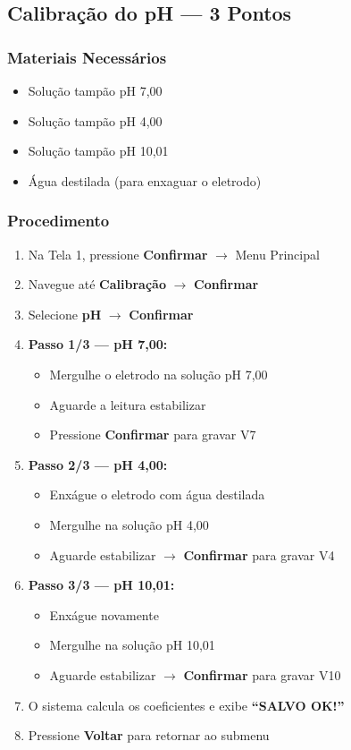 \documentclass[12pt,a4paper]{article}
\begin{document}
\subsection{Calibração do pH --- 3 Pontos}

\subsubsection{Materiais Necessários}
\begin{itemize}[nosep]
  \item Solução tampão pH 7,00
  \item Solução tampão pH 4,00
  \item Solução tampão pH 10,01
  \item Água destilada (para enxaguar o eletrodo)
\end{itemize}

\subsubsection{Procedimento}

\begin{enumerate}[nosep]
  \item Na Tela 1, pressione \textbf{Confirmar} $\rightarrow$ Menu Principal
  \item Navegue até \textbf{Calibração} $\rightarrow$ \textbf{Confirmar}
  \item Selecione \textbf{pH} $\rightarrow$ \textbf{Confirmar}
  \item \textbf{Passo 1/3 --- pH 7,00:}
  \begin{itemize}[nosep]
    \item Mergulhe o eletrodo na solução pH 7,00
    \item Aguarde a leitura estabilizar
    \item Pressione \textbf{Confirmar} para gravar V7
  \end{itemize}
  \item \textbf{Passo 2/3 --- pH 4,00:}
  \begin{itemize}[nosep]
    \item Enxágue o eletrodo com água destilada
    \item Mergulhe na solução pH 4,00
    \item Aguarde estabilizar $\rightarrow$ \textbf{Confirmar} para gravar V4
  \end{itemize}
  \item \textbf{Passo 3/3 --- pH 10,01:}
  \begin{itemize}[nosep]
    \item Enxágue novamente
    \item Mergulhe na solução pH 10,01
    \item Aguarde estabilizar $\rightarrow$ \textbf{Confirmar} para gravar V10
  \end{itemize}
  \item O sistema calcula os coeficientes e exibe \textbf{``SALVO OK!''}
  \item Pressione \textbf{Voltar} para retornar ao submenu
\end{enumerate}
\end{document}
